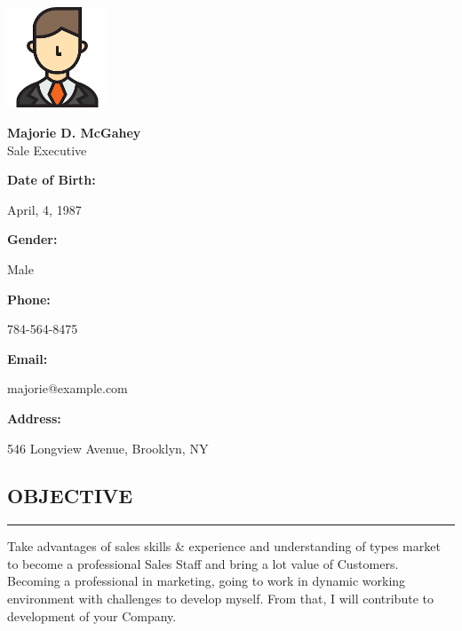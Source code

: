 \documentclass[12pt]{article}
\begin{document}
	
%	 
	
	\pagestyle{empty}
	
	\begin{minipage}[t]{5cm}
		\includegraphics[width=3cm]{user.png}
	\end{minipage}
	\begin{minipage}[t]{0.7\linewidth}
		\vspace*{-3cm}
		\textbf{\fontsize{24pt}{36pt}\selectfont Majorie D. McGahey}\\
		{\fontsize{16pt}{24pt}\selectfont Sale Executive}\\[0.25cm]
		\parbox{3cm}{\textbf{Date of Birth: }} April, 4, 1987\\
		\parbox{3cm}{\textbf{Gender:}} Male\\
		\parbox{3cm}{\textbf{Phone:}} 784-564-8475\\
		\parbox{3cm}{\textbf{Email: }} majorie@example.com\\
		\parbox{3cm}{\textbf{Address: }} 546 Longview Avenue, Brooklyn, NY
	\end{minipage}
	
	
	\vspace*{-0.5cm}
	\subsection*{OBJECTIVE}
	\vspace*{-0.25cm}
	\hrule
	\vspace*{0.5cm}
	\par Take advantages of sales skills \& experience and understanding of types market to become a professional Sales Staff and bring a lot value of Customers. Becoming a professional in marketing, going to work in dynamic working environment with challenges to develop myself. From that, I will contribute to development of your Company.
\end{document}
